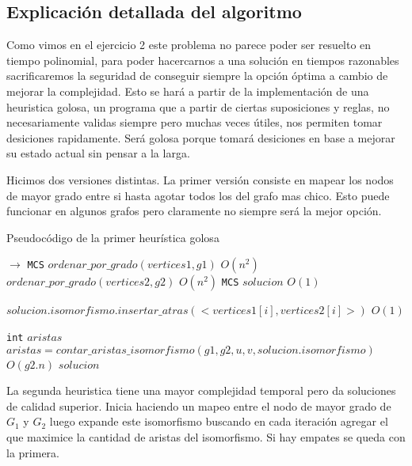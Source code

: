 \subsection{Explicación detallada del algoritmo}

Como vimos en el ejercicio 2 este problema no parece poder ser resuelto en tiempo polinomial, para poder hacercarnos a una solución en tiempos razonables sacrificaremos la seguridad de conseguir siempre la opción óptima a cambio de mejorar la complejidad. Esto se hará a partir de la implementación de una heuristica golosa, un programa que a partir de ciertas suposiciones y reglas, no necesariamente validas siempre pero muchas veces útiles, nos permiten tomar desiciones rapidamente. Será golosa porque tomará desiciones en base a mejorar su estado actual sin pensar a la larga.

Hicimos dos versiones distintas. La primer versión consiste en mapear los nodos de mayor grado entre si hasta agotar todos los del grafo mas chico. Esto puede funcionar en algunos grafos pero claramente no siempre será la mejor opción.

\begin{algorithm}[H]
  \begin{algorithmic}[1]
  \caption{Pseudocódigo de la primer heurística golosa}
  \label{algo:4-1}
     $\to$ \texttt{MCS}
      \State $ordenar\_por\_grado(vertices1, g1)$ 
        \Comment $O(n^2)$ 
      \State $ordenar\_por\_grado(vertices2, g2)$ 
        \Comment $O(n^2)$ 
      \State \texttt{MCS} $solucion$ 
        \Comment $O(1)$ 

	  \State  $solucion.isomorfismo.insertar\_atras(<vertices1[i],vertices2[i]>)$
      \Comment $O(1)$
    	  \EndFor

	  \State \texttt{int} $aristas$
	  \State $ aristas = contar\_aristas\_isomorfismo(g1,g2,u,v, solucion.isomorfismo)$
      \Comment $O(g2.n)$
      \State \Return $solucion$
      \EndProcedure
	\end{algorithmic}
\end{algorithm}


La segunda heuristica tiene una mayor complejidad temporal pero da soluciones de calidad superior. Inicia haciendo un mapeo entre el nodo de mayor grado de $G_1$ y $G_2$ luego expande este isomorfismo buscando en cada iteración agregar el que maximice la cantidad de aristas del isomorfismo. Si hay empates se queda con la primera.



